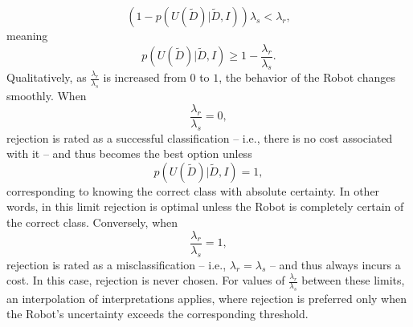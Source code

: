 \begin{example}
	\begin{equation}
		(1-p(U(\tilde{D})|\tilde{D},I))\lambda_s< \lambda_r,
	\end{equation}
	meaning
	\begin{equation}
		p(U(\tilde{D})|\tilde{D},I)\geq 1-\frac{\lambda_r}{\lambda_s}.
	\end{equation}
	Qualitatively, as $\frac{\lambda_r}{\lambda_s}$ is increased from $0$ to $1$, the behavior of the Robot changes smoothly. When
	\begin{equation}
		\frac{\lambda_r}{\lambda_s}=0,
	\end{equation}
	rejection is rated as a successful classification -- i.e., there is no cost associated with it -- and thus becomes the best option unless
	\begin{equation}
		p(U(\tilde{D})|\tilde{D},I)=1,
	\end{equation}
	corresponding to knowing the correct class with absolute certainty. In other words, in this limit rejection is optimal unless the Robot is completely certain of the correct class. Conversely, when
	\begin{equation}
		\frac{\lambda_r}{\lambda_s}=1,
	\end{equation}
	rejection is rated as a misclassification -- i.e., $\lambda_r=\lambda_s$ -- and thus always incurs a cost. In this case, rejection is never chosen. For values of $\frac{\lambda_r}{\lambda_s}$ between these limits, an interpolation of interpretations applies, where rejection is preferred only when the Robot's uncertainty exceeds the corresponding threshold.
\end{example}
